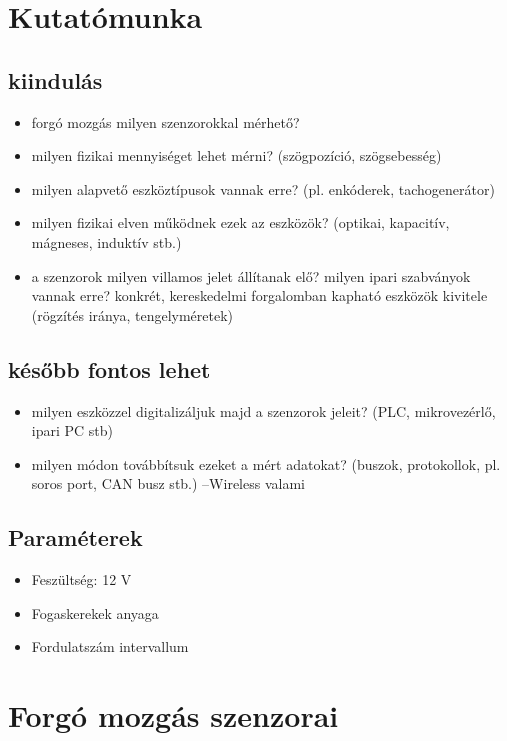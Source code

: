 \documentclass{article}
\begin{document}
	\section{Kutatómunka}
	\subsection{kiindulás}
	\begin{itemize}
		\item forgó mozgás milyen szenzorokkal mérhető?
		\item milyen fizikai mennyiséget lehet mérni? (szögpozíció, szögsebesség)
		\item milyen alapvető eszköztípusok vannak erre? (pl. enkóderek, tachogenerátor)
		\item milyen fizikai elven működnek ezek az eszközök? (optikai, kapacitív, mágneses, induktív stb.)
		\item a szenzorok milyen villamos jelet állítanak elő? milyen ipari szabványok vannak erre?
		konkrét, kereskedelmi forgalomban kapható eszközök kivitele (rögzítés iránya, tengelyméretek)
	\end{itemize}
	
	\subsection{később fontos lehet}
	\begin{itemize}
		\item milyen eszközzel digitalizáljuk majd a szenzorok jeleit? (PLC, mikrovezérlő, ipari PC stb)
		\item milyen módon továbbítsuk ezeket a mért adatokat? (buszok, protokollok, pl. soros port, CAN busz stb.) --Wireless valami
	\end{itemize}
	
	\subsection{Paraméterek}
	\begin{itemize}
		\item Feszültség: 12 V
		\item Fogaskerekek anyaga
		\item Fordulatszám intervallum
		
	\end{itemize}
	
	
	
	\section{Forgó mozgás szenzorai}
	
\end{document}
